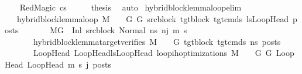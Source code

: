 \begin{isabellebody}
\isamarkupfalse%
\isanewline
\ \ \isamarkupfalse%
\ {\isacharparenleft}{\kern0pt}RedMagic\ cs{\isacharparenright}{\kern0pt}\isanewline
\ \ \isamarkupfalse%
\ \isamarkupfalse%
\ {\isacharquery}{\kern0pt}thesis\ \isamarkupfalse%
\ auto\isanewline
{}\isamarkupfalse%
%
\endisatagproof
{\isafoldproof}%
%
\isadelimproof
\isanewline
%
\endisadelimproof
\isanewline
{}\isamarkupfalse%
\ hybrid{\isacharunderscore}{\kern0pt}block{\isacharunderscore}{\kern0pt}lemma{\isacharunderscore}{\kern0pt}loop{\isacharunderscore}{\kern0pt}elim{\isacharcolon}{\kern0pt}\isanewline
\ \ \ {\isachardoublequoteopen}hybrid{\isacharunderscore}{\kern0pt}block{\isacharunderscore}{\kern0pt}lemma{\isacharunderscore}{\kern0pt}loop\ M\ {\isasymLambda}\ {\isasymGamma}\ {\isasymOmega}\ G\ G{\isacharprime}{\kern0pt}\ src{\isacharunderscore}{\kern0pt}block\ tgt{\isacharunderscore}{\kern0pt}block\ tgt{\isacharunderscore}{\kern0pt}cmds\ lsLoopHead\ posts{\isachardoublequoteclose}\isanewline
\ \ \ \ \ \ \ {\isachardoublequoteopen}M{\isacharcomma}{\kern0pt}{\isasymLambda}{\isacharcomma}{\kern0pt}{\isasymGamma}{\isacharcomma}{\kern0pt}{\isasymOmega}{\isacharcomma}{\kern0pt}G\ {\isasymturnstile}\ {\isacharparenleft}{\kern0pt}Inl\ src{\isacharunderscore}{\kern0pt}block{\isacharcomma}{\kern0pt}\ {\isacharparenleft}{\kern0pt}Normal\ ns{\isacharparenright}{\kern0pt}{\isacharparenright}{\kern0pt}\ {\isacharminus}{\kern0pt}n{\isasymrightarrow}{\isacharcircum}{\kern0pt}j\ {\isacharparenleft}{\kern0pt}m{\isacharprime}{\kern0pt}{\isacharcomma}{\kern0pt}\ s{\isacharprime}{\kern0pt}{\isacharparenright}{\kern0pt}{\isachardoublequoteclose}\isanewline
\ \ \ \ \ \ \ {\isachardoublequoteopen}hybrid{\isacharunderscore}{\kern0pt}block{\isacharunderscore}{\kern0pt}lemma{\isacharunderscore}{\kern0pt}target{\isacharunderscore}{\kern0pt}verifies\ M\ {\isasymLambda}\ {\isasymGamma}\ {\isasymOmega}\ G{\isacharprime}{\kern0pt}\ tgt{\isacharunderscore}{\kern0pt}block\ tgt{\isacharunderscore}{\kern0pt}cmds\ ns\ posts{\isachardoublequoteclose}\isanewline
\ \ \ \ \ \ \ {\isachardoublequoteopen}{\isasymforall}{\isacharparenleft}{\kern0pt}LoopHead{\isacharcomma}{\kern0pt}\ LoopHead{\isacharprime}{\kern0pt}{\isacharparenright}{\kern0pt}{\isasymin}lsLoopHead{\isachardot}{\kern0pt}\ loop{\isacharunderscore}{\kern0pt}ih{\isacharunderscore}{\kern0pt}optimizations\ M\ {\isasymLambda}\ {\isasymGamma}\ {\isasymOmega}\ G\ G{\isacharprime}{\kern0pt}\ LoopHead\ LoopHead{\isacharprime}{\kern0pt}\ m{\isacharprime}{\kern0pt}\ s{\isacharprime}{\kern0pt}\ j\ posts{\isachardoublequoteclose}\isanewline

\end{isabellebody}
